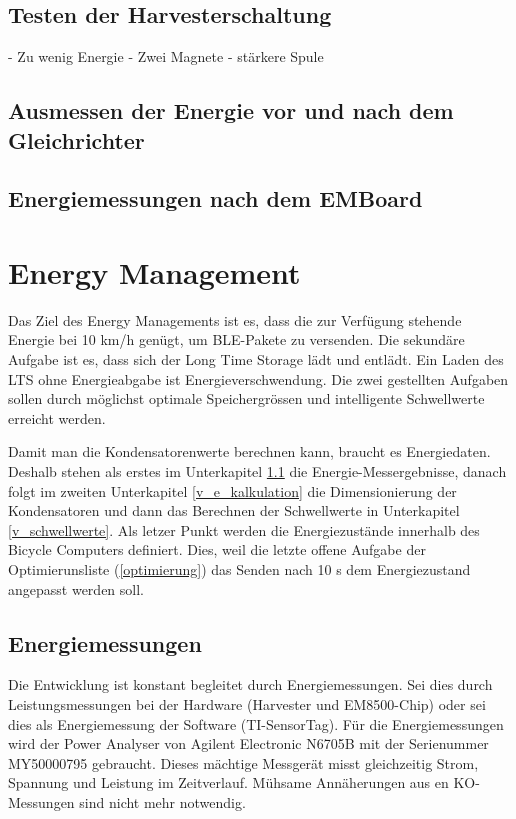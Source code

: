 \subsection{Testen der Harvesterschaltung}

- Zu wenig Energie
- Zwei Magnete
- stärkere Spule

\subsection{Ausmessen der Energie vor und nach dem Gleichrichter}


\subsection{Energiemessungen nach dem EMBoard}



\section{Energy Management}

Das Ziel des Energy Managements ist es, dass die zur Verfügung stehende Energie bei 10 km/h genügt, um BLE-Pakete zu versenden. Die sekundäre Aufgabe ist es, dass sich der Long Time Storage lädt und entlädt. Ein Laden des LTS ohne Energieabgabe ist Energieverschwendung. Die zwei gestellten Aufgaben sollen durch möglichst optimale Speichergrössen und intelligente Schwellwerte erreicht werden.

Damit man die Kondensatorenwerte berechnen kann, braucht es Energiedaten. Deshalb stehen als erstes im Unterkapitel \ref{v_messungen_sensortag} die Energie-Messergebnisse, danach folgt im zweiten Unterkapitel \ref{v_e_kalkulation} die Dimensionierung der Kondensatoren und dann das Berechnen der Schwellwerte in Unterkapitel \ref{v_schwellwerte}. Als letzer Punkt werden die Energiezustände innerhalb des Bicycle Computers definiert. Dies, weil die letzte offene Aufgabe der Optimierunsliste (\ref{optimierung}) das Senden nach 10 s dem Energiezustand angepasst werden soll.


\subsection{Energiemessungen}
\label{v_messungen_sensortag}


Die Entwicklung ist konstant begleitet durch Energiemessungen. Sei dies durch Leistungsmessungen bei der Hardware (Harvester und EM8500-Chip) oder sei dies als Energiemessung der Software (TI-SensorTag). Für die Energiemessungen wird der Power Analyser von Agilent Electronic N6705B mit der Serienummer MY50000795 gebraucht. Dieses mächtige Messgerät misst gleichzeitig Strom, Spannung und Leistung im Zeitverlauf. Mühsame Annäherungen aus en KO-Messungen sind nicht mehr notwendig.

